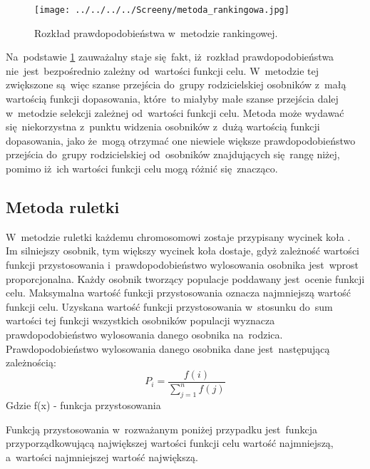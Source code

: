 \vspace{0,4cm}

\begin{figure}[h]
		\texttt{[image: ../../../../Screeny/metoda\_rankingowa.jpg]}
		\caption{Rozkład prawdopodobieństwa w~metodzie rankingowej.}
		\label{rankingR}			
\end{figure}
\par
Na~podstawie \ref{rankingR} zauważalny staje się~fakt, iż~rozkład prawdopodobieństwa nie~jest~bezpośrednio zależny od~wartości funkcji celu. W~metodzie tej zwiększone są~więc szanse przejścia do~grupy rodzicielskiej osobników z~małą wartością funkcji dopasowania, które~to miałyby małe szanse przejścia dalej w~metodzie selekcji zależnej od~wartości funkcji celu. Metoda może wydawać się~niekorzystna z~punktu widzenia osobników z~dużą wartością funkcji dopasowania, jako że~mogą otrzymać one niewiele większe prawdopodobieństwo przejścia do~grupy rodzicielskiej od~osobników znajdujących się~rangę niżej, pomimo iż~ich wartości funkcji celu mogą różnić się~znacząco.

\subsection{Metoda ruletki}\label{sec:narzedzia}


W~metodzie ruletki każdemu chromosomowi zostaje przypisany wycinek koła \cite{selekcje}. Im silniejszy osobnik, tym większy wycinek koła dostaje, gdyż zależność wartości funkcji przystosowania i~prawdopodobieństwo wylosowania osobnika jest~wprost proporcjonalna. Każdy osobnik tworzący populacje poddawany jest~ocenie funkcji celu. Maksymalna wartość funkcji przystosowania oznacza najmniejszą wartość funkcji celu. Uzyskana wartość funkcji przystosowania w~stosunku do~sum wartości tej funkcji wszystkich osobników populacji wyznacza prawdopodobieństwo wylosowania danego osobnika na~rodzica. Prawdopodobieństwo wylosowania danego osobnika dane jest~następującą zależnością:
\begin{equation}
P_i = \frac{f(i)}{\sum_{j=1}^{n}f(j)}
\end{equation}
Gdzie f(x) - funkcja przystosowania\\
\par
Funkcją przystosowania w~rozważanym poniżej przypadku jest~funkcja przyporządkowującą największej wartości funkcji celu wartość najmniejszą, a~wartości najmniejszej wartość największą.

